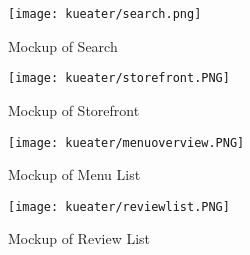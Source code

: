 \begin{figure}[h!]
    \begin{minipage}{.5\textwidth}
        \centering
        \texttt{[image: kueater/search.png]}
        \caption{Mockup of Search}
    \end{minipage}%
    \begin{minipage}{.5\textwidth}
        \centering
        \texttt{[image: kueater/storefront.PNG]}
        \caption{Mockup of Storefront}
    \end{minipage}
    \vspace*{-\baselineskip}
\end{figure}

\begin{figure}[h!]
    \begin{minipage}{.5\textwidth}
        \centering
        \texttt{[image: kueater/menuoverview.PNG]}
        \caption{Mockup of Menu List}
    \end{minipage}%
    \begin{minipage}{.5\textwidth}
        \centering
        \texttt{[image: kueater/reviewlist.PNG]}
        \caption{Mockup of Review List}
    \end{minipage}
    \vspace*{-\baselineskip}
\end{figure}